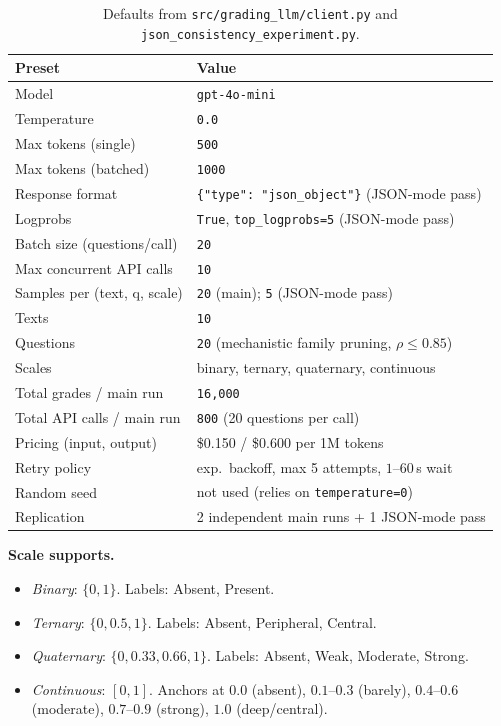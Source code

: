 \documentclass[11pt]{article}
\begin{document}
\begin{table}[h]
\centering
\small
\begin{tabular}{ll}
\toprule
\textbf{Preset} & \textbf{Value} \\
\midrule
Model                       & \texttt{gpt-4o-mini} \\
Temperature                 & \texttt{0.0} \\
Max tokens (single)         & \texttt{500} \\
Max tokens (batched)        & \texttt{1000} \\
Response format             & \texttt{\{"type": "json\_object"\}} (JSON-mode pass) \\
Logprobs                    & \texttt{True}, \texttt{top\_logprobs=5} (JSON-mode pass) \\
Batch size (questions/call) & \texttt{20} \\
Max concurrent API calls    & \texttt{10} \\
Samples per (text, q, scale)& \texttt{20} (main); \texttt{5} (JSON-mode pass) \\
Texts                       & \texttt{10} \\
Questions                   & \texttt{20} (mechanistic family pruning, $\rho \le 0.85$) \\
Scales                      & binary, ternary, quaternary, continuous \\
Total grades / main run     & \texttt{16{,}000} \\
Total API calls / main run  & \texttt{800} (20 questions per call) \\
Pricing (input, output)     & \$0.150 / \$0.600 per 1M tokens \\
Retry policy                & exp.\ backoff, max 5 attempts, $1$--$60$\,s wait \\
Random seed                 & not used (relies on \texttt{temperature=0}) \\
Replication                 & 2 independent main runs + 1 JSON-mode pass \\
\bottomrule
\end{tabular}
\caption{Defaults from \texttt{src/grading\_llm/client.py} and \texttt{json\_consistency\_experiment.py}.}
\end{table}

\textbf{Scale supports.}
\begin{itemize}
\item \emph{Binary}: $\{0, 1\}$. Labels: Absent, Present.
\item \emph{Ternary}: $\{0, 0.5, 1\}$. Labels: Absent, Peripheral, Central.
\item \emph{Quaternary}: $\{0, 0.33, 0.66, 1\}$. Labels: Absent, Weak, Moderate, Strong.
\item \emph{Continuous}: $[0, 1]$. Anchors at $0.0$ (absent), $0.1$--$0.3$ (barely), $0.4$--$0.6$ (moderate), $0.7$--$0.9$ (strong), $1.0$ (deep/central).
\end{itemize}
\end{document}
